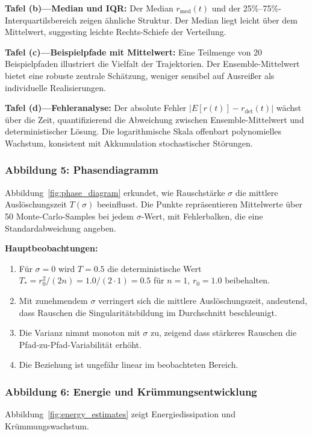 \documentclass[a4paper,12pt]{article}
\theoremstyle{definition}
\begin{document}
\textbf{Tafel (b)---Median und IQR:} Der Median $r_{\text{med}}(t)$ und der 25\%--75\%-Interquartilsbereich zeigen ähnliche Struktur. Der Median liegt leicht über dem Mittelwert, suggesting leichte Rechts-Schiefe der Verteilung.

\textbf{Tafel (c)---Beispielpfade mit Mittelwert:} Eine Teilmenge von 20 Beispielpfaden illustriert die Vielfalt der Trajektorien. Der Ensemble-Mittelwert bietet eine robuste zentrale Schätzung, weniger sensibel auf Ausreißer als individuelle Realisierungen.

\textbf{Tafel (d)---Fehleranalyse:} Der absolute Fehler $|E[r(t)] - r_{\text{det}}(t)|$ wächst über die Zeit, quantifizierend die Abweichung zwischen Ensemble-Mittelwert und deterministischer Lösung. Die logarithmische Skala offenbart polynomielles Wachstum, konsistent mit Akkumulation stochastischer Störungen.

\subsubsection{Abbildung 5: Phasendiagramm}

Abbildung~\ref{fig:phase_diagram} erkundet, wie Rauschstärke $\sigma$ die mittlere Auslöschungszeit $T(\sigma)$ beeinflusst. Die Punkte repräsentieren Mittelwerte über 50 Monte-Carlo-Samples bei jedem $\sigma$-Wert, mit Fehlerbalken, die eine Standardabweichung angeben.

\textbf{Hauptbeobachtungen:}
\begin{enumerate}
	\item Für $\sigma = 0$ wird $T = 0.5$ die deterministische Wert $T_* = r_0^2/(2n) = 1.0/(2 \cdot 1) = 0.5$ für $n=1$, $r_0 = 1.0$ beibehalten.
	\item Mit zunehmendem $\sigma$ verringert sich die mittlere Auslöschungszeit, andeutend, dass Rauschen die Singularitätsbildung im Durchschnitt beschleunigt.
	\item Die Varianz nimmt monoton mit $\sigma$ zu, zeigend dass stärkeres Rauschen die Pfad-zu-Pfad-Variabilität erhöht.
	\item Die Beziehung ist ungefähr linear im beobachteten Bereich.
\end{enumerate}

\subsubsection{Abbildung 6: Energie und Krümmungsentwicklung}

Abbildung~\ref{fig:energy_estimates} zeigt Energiedissipation und Krümmungswachstum.
\end{document}
